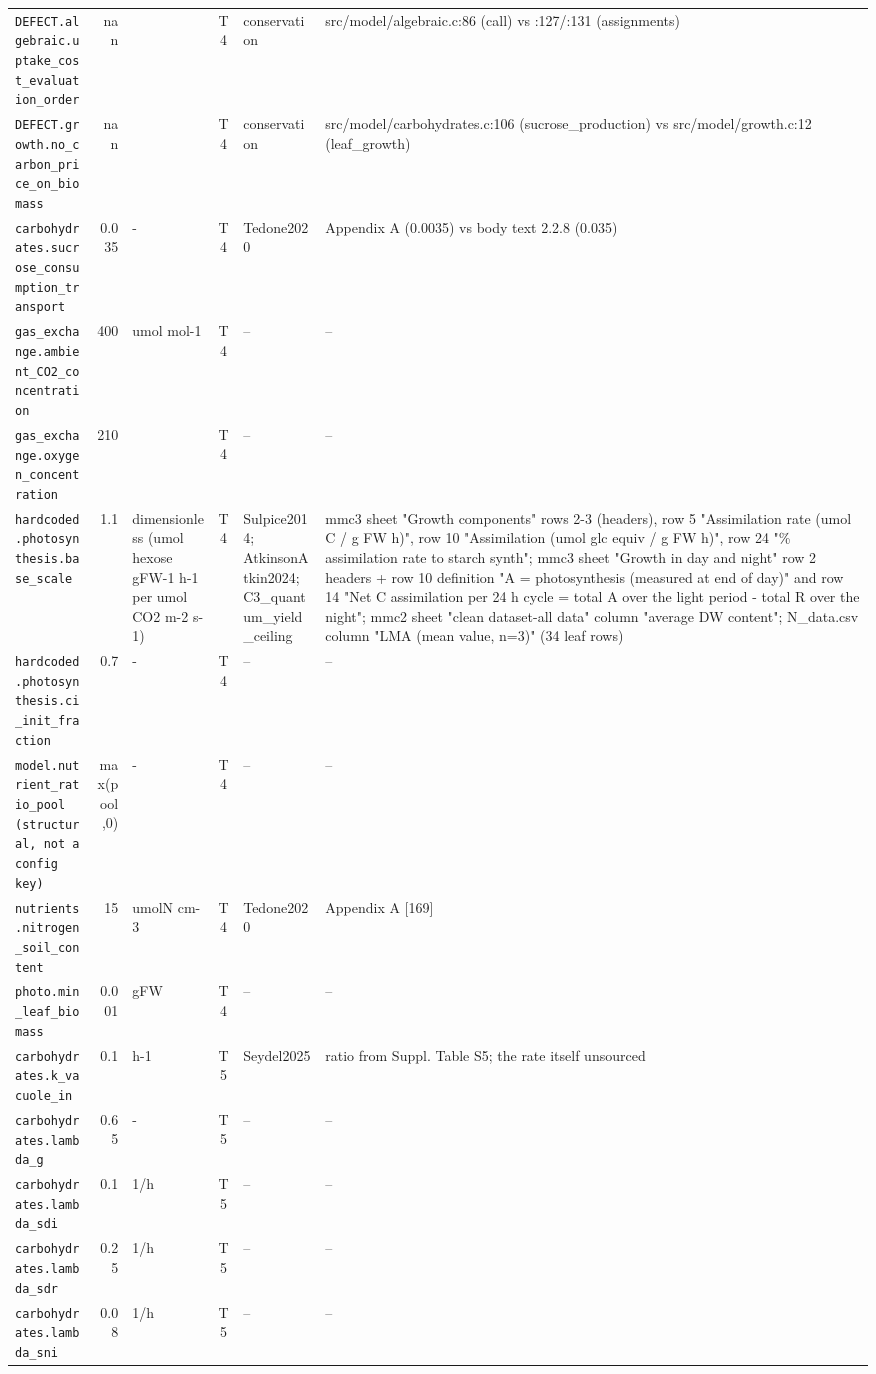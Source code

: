 \begin{table}[!htbp]
\begin{tabular}{@{}p{52mm}rp{20mm}cp{20mm}p{38mm}@{}}
\texttt{DEFECT.algebraic.uptake\_cost\_evaluation\_order} & nan &  & T4 & conservation & src/model/algebraic.c:86 (call) vs :127/:131 (assignments) \\
\texttt{DEFECT.growth.no\_carbon\_price\_on\_biomass} & nan &  & T4 & conservation & src/model/carbohydrates.c:106 (sucrose\_production) vs src/model/growth.c:12 (leaf\_growth) \\
\texttt{carbohydrates.sucrose\_consumption\_transport} & 0.035 & - & T4 & Tedone2020 & Appendix A (0.0035) vs body text 2.2.8 (0.035) \\
\texttt{gas\_exchange.ambient\_CO2\_concentration} & 400 & umol mol-1 & T4 & -- & -- \\
\texttt{gas\_exchange.oxygen\_concentration} & 210 &  & T4 & -- & -- \\
\texttt{hardcoded.photosynthesis.base\_scale} & 1.1 & dimensionless (umol hexose gFW-1 h-1 per umol CO2 m-2 s-1) & T4 & Sulpice2014; AtkinsonAtkin2024; C3\_quantum\_yield\_ceiling & mmc3 sheet "Growth components" rows 2-3 (headers), row 5 "Assimilation rate (umol C / g FW h)", row 10 "Assimilation (umol glc equiv / g FW h)", row 24 "\% assimilation rate to starch synth"; mmc3 sheet "Growth in day and night" row 2 headers + row 10 definition "A = photosynthesis (measured at end of day)" and row 14 "Net C assimilation per 24 h cycle = total A over the light period - total R over the night"; mmc2 sheet "clean dataset-all data" column "average DW content"; N\_data.csv column "LMA  (mean value, n=3)" (34 leaf rows) \\
\texttt{hardcoded.photosynthesis.ci\_init\_fraction} & 0.7 & - & T4 & -- & -- \\
\texttt{model.nutrient\_ratio\_pool (structural, not a config key)} & max(pool,0) & - & T4 & -- & -- \\
\texttt{nutrients.nitrogen\_soil\_content} & 15 & umolN cm-3 & T4 & Tedone2020 & Appendix A [169] \\
\texttt{photo.min\_leaf\_biomass} & 0.001 & gFW & T4 & -- & -- \\
\texttt{carbohydrates.k\_vacuole\_in} & 0.1 & h-1 & T5 & Seydel2025 & ratio from Suppl. Table S5; the rate itself unsourced \\
\texttt{carbohydrates.lambda\_g} & 0.65 & - & T5 & -- & -- \\
\texttt{carbohydrates.lambda\_sdi} & 0.1 & 1/h & T5 & -- & -- \\
\texttt{carbohydrates.lambda\_sdr} & 0.25 & 1/h & T5 & -- & -- \\
\texttt{carbohydrates.lambda\_sni} & 0.08 & 1/h & T5 & -- & -- \\

\end{tabular}
\end{table}
